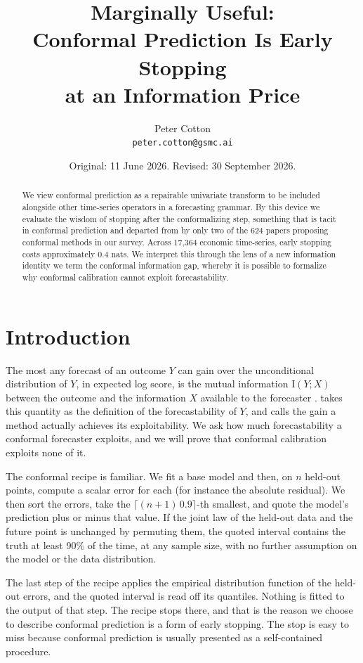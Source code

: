 \documentclass[11pt]{article}
\title{Marginally Useful:\\ Conformal Prediction Is Early Stopping\\ at an Information Price}
\author{}
\author{Peter Cotton\\\texttt{peter.cotton@gsmc.ai}}
\date{Original: 11 June 2026. Revised: 30 September 2026.}
\theoremstyle{remark}
\newcommand{\I}{\mathrm{I}}
\begin{document}
\maketitle

\begin{abstract}
We view conformal prediction as a repairable univariate transform to be included alongside other time-series operators
in a forecasting grammar. By this device we evaluate the wisdom of stopping after the conformalizing step, something that
is tacit in conformal prediction and departed from by only two of the 624 papers proposing conformal methods in our survey. Across 17,364 economic time-series,
 early stopping costs approximately 0.4 nats. We interpret this through the lens of a new information identity we term the conformal information gap,
 whereby it is possible to formalize why conformal calibration cannot exploit forecastability. 
\end{abstract}

\section{Introduction}\label{sec:intro}


The most any forecast of an outcome $Y$ can gain over the unconditional distribution
of $Y$, in expected log score, is the mutual information $\I(Y;X)$ between the outcome
and the information $X$ available to the forecaster \citep{delsole2004}.
\citet{catt2026} takes this quantity as the definition of the forecastability of $Y$,
and calls the gain a method actually achieves its exploitability. We ask how much
forecastability a conformal forecaster exploits, and we will prove that conformal
calibration exploits none of it. 


The conformal recipe is familiar. We fit a base model and then, on $n$ held-out points, compute a scalar error
for each (for instance the absolute residual). We then sort the errors, take the
$\lceil (n+1)\,0.9\rceil$-th smallest, and quote the model's prediction plus or
minus that value. If the joint law of the held-out data and the future point is
unchanged by permuting them, the quoted interval contains
the truth at least 90\% of the time, at any sample size, with no further assumption on
the model or the data distribution.


The last step of the recipe applies the empirical distribution function of the
held-out errors, and the quoted interval is read off its quantiles. Nothing is fitted
to the output of that step. The recipe stops there, and that is the reason we 
choose to describe conformal prediction is a form of early stopping. The stop
 is easy to miss because conformal prediction is usually presented as a
self-contained procedure. 
\end{document}
